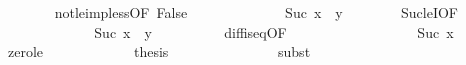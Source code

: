 \begin{isabellebody}
\ \ \ \ \ \ \isamarkupfalse%
\ not{\isacharunderscore}{\kern0pt}le{\isacharunderscore}{\kern0pt}imp{\isacharunderscore}{\kern0pt}less{\isacharbrackleft}{\kern0pt}OF\ False{\isacharbrackright}{\kern0pt}\isanewline
\ \ \ \ \ \ \isacommand{{\isachardot}{\kern0pt}}\isamarkupfalse%
\isanewline
\ \ \ \ \isamarkupfalse%
\ {}{\isacharcolon}{\kern0pt}\ {\isachardoublequoteopen}Suc\ x\ {\isasymle}\ y{\isachardoublequoteclose}\isanewline
\ \ \ \ \ \ \isamarkupfalse%
\ Suc{\isacharunderscore}{\kern0pt}leI{\isacharbrackleft}{\kern0pt}OF\ {}{\isacharbrackright}{\kern0pt}\isanewline
\ \ \ \ \ \ \isacommand{{\isachardot}{\kern0pt}}\isamarkupfalse%
\isanewline
\ \ \ \ \isamarkupfalse%
\ {}{\isacharcolon}{\kern0pt}\ {\isachardoublequoteopen}Suc\ x\ {\isacharminus}{\kern0pt}\ y\ {\isacharequal}{\kern0pt}\ {}{\isachardoublequoteclose}\isanewline
\ \ \ \ \ \ \isamarkupfalse%
\ diff{\isacharunderscore}{\kern0pt}is{\isacharunderscore}{\kern0pt}{}{\isacharunderscore}{\kern0pt}eq{\isacharprime}{\kern0pt}{\isacharbrackleft}{\kern0pt}OF\ {}{\isacharbrackright}{\kern0pt}\isanewline
\ \ \ \ \ \ \isacommand{{\isachardot}{\kern0pt}}\isamarkupfalse%
\ \isanewline
\ \ \ \ \isamarkupfalse%
\ {}{\isacharcolon}{\kern0pt}\ {\isachardoublequoteopen}{}\ {\isasymle}\ Suc\ x{\isachardoublequoteclose}\isanewline
\ \ \ \ \ \ \isamarkupfalse%
\ zero{\isacharunderscore}{\kern0pt}le\isanewline
\ \ \ \ \ \ \isacommand{{\isachardot}{\kern0pt}}\isamarkupfalse%
\isanewline
\ \ \ \ \isamarkupfalse%
\ {\isacharquery}{\kern0pt}thesis\isanewline
\ \ \ \ \ \ \isamarkupfalse%
\ {}\isanewline
\ \ \ \ \ \ \isamarkupfalse%
{\isacharparenleft}{\kern0pt}subst\ {}{\isacharparenright}{\kern0pt}\isanewline
\ \ \ \ \ \ \isacommand{{\isachardot}{\kern0pt}}\isamarkupfalse%
\isanewline
\ \ \isamarkupfalse%
\isanewline
{}\isamarkupfalse%
%
\endisatagproof
{\isafoldproof}%
%
\isadelimproof
\isanewline
%
\endisadelimproof
\isanewline
%
\isadelimtheory
\isanewline
%
\endisadelimtheory
%
\isatagtheory
{}\isamarkupfalse%
%
\endisatagtheory
{\isafoldtheory}%
%
\isadelimtheory
%
\endisadelimtheory
%
\end{isabellebody}%
\endinput
